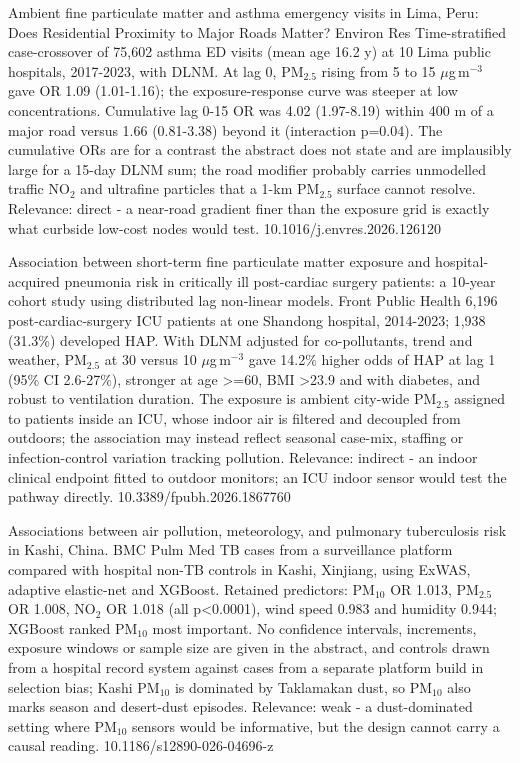 \documentclass[10pt]{article}
\begin{document}
{Ambient fine particulate matter and asthma emergency visits in Lima, Peru: Does Residential Proximity to Major Roads Matter?}
{Environ Res}
{Time-stratified case-crossover of 75,602 asthma ED visits (mean age 16.2 y) at 10 Lima public hospitals, 2017-2023, with DLNM. At lag 0, PM$_{2.5}$ rising from 5 to 15 $\mu$g\,m$^{-3}$ gave OR 1.09 (1.01-1.16); the exposure-response curve was steeper at low concentrations. Cumulative lag 0-15 OR was 4.02 (1.97-8.19) within 400 m of a major road versus 1.66 (0.81-3.38) beyond it (interaction p=0.04). The cumulative ORs are for a contrast the abstract does not state and are implausibly large for a 15-day DLNM sum; the road modifier probably carries unmodelled traffic NO$_2$ and ultrafine particles that a 1-km PM$_{2.5}$ surface cannot resolve. Relevance: direct - a near-road gradient finer than the exposure grid is exactly what curbside low-cost nodes would test.}
{10.1016/j.envres.2026.126120}

{Association between short-term fine particulate matter exposure and hospital-acquired pneumonia risk in critically ill post-cardiac surgery patients: a 10-year cohort study using distributed lag non-linear models.}
{Front Public Health}
{6,196 post-cardiac-surgery ICU patients at one Shandong hospital, 2014-2023; 1,938 (31.3\%) developed HAP. With DLNM adjusted for co-pollutants, trend and weather, PM$_{2.5}$ at 30 versus 10 $\mu$g\,m$^{-3}$ gave 14.2\% higher odds of HAP at lag 1 (95\% CI 2.6-27\%), stronger at age >=60, BMI >23.9 and with diabetes, and robust to ventilation duration. The exposure is ambient city-wide PM$_{2.5}$ assigned to patients inside an ICU, whose indoor air is filtered and decoupled from outdoors; the association may instead reflect seasonal case-mix, staffing or infection-control variation tracking pollution. Relevance: indirect - an indoor clinical endpoint fitted to outdoor monitors; an ICU indoor sensor would test the pathway directly.}
{10.3389/fpubh.2026.1867760}

{Associations between air pollution, meteorology, and pulmonary tuberculosis risk in Kashi, China.}
{BMC Pulm Med}
{TB cases from a surveillance platform compared with hospital non-TB controls in Kashi, Xinjiang, using ExWAS, adaptive elastic-net and XGBoost. Retained predictors: PM$_{10}$ OR 1.013, PM$_{2.5}$ OR 1.008, NO$_2$ OR 1.018 (all p<0.0001), wind speed 0.983 and humidity 0.944; XGBoost ranked PM$_{10}$ most important. No confidence intervals, increments, exposure windows or sample size are given in the abstract, and controls drawn from a hospital record system against cases from a separate platform build in selection bias; Kashi PM$_{10}$ is dominated by Taklamakan dust, so PM$_{10}$ also marks season and desert-dust episodes. Relevance: weak - a dust-dominated setting where PM$_{10}$ sensors would be informative, but the design cannot carry a causal reading.}
{10.1186/s12890-026-04696-z}
\end{document}
